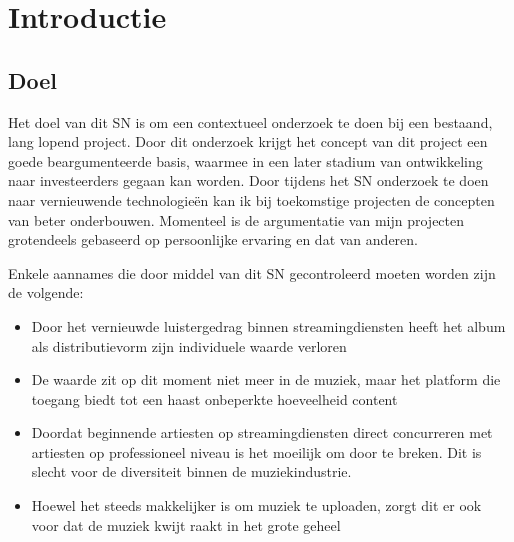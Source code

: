 \section{Introductie}

\subsection{Doel}
Het doel van dit SN is om een contextueel onderzoek te doen bij een bestaand, lang lopend project. Door dit onderzoek krijgt het concept van dit project een goede beargumenteerde basis, waarmee in een later stadium van ontwikkeling naar investeerders gegaan kan worden. Door tijdens het SN onderzoek te doen naar vernieuwende technologieën kan ik bij toekomstige projecten de concepten van beter onderbouwen. Momenteel is de argumentatie van mijn projecten grotendeels gebaseerd op persoonlijke ervaring en dat van anderen.

Enkele aannames die door middel van dit SN gecontroleerd moeten worden zijn de volgende:

\begin{itemize}
    \item Door het vernieuwde luistergedrag binnen streamingdiensten heeft het album als distributievorm zijn individuele waarde verloren
    \item De waarde zit op dit moment niet meer in de muziek, maar het platform die toegang biedt tot een haast onbeperkte hoeveelheid content
    \item Doordat beginnende artiesten op streamingdiensten direct concurreren met artiesten op professioneel niveau is het moeilijk om door te breken. Dit is slecht voor de diversiteit binnen de muziekindustrie.
    \item Hoewel het steeds makkelijker is om muziek te uploaden, zorgt dit er ook voor dat de muziek kwijt raakt in het grote geheel
\end{itemize}
